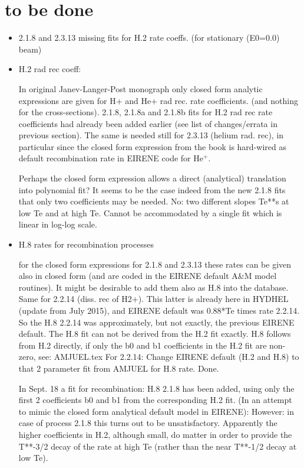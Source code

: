 \documentclass[12pt,dvipdfmx]{article}
\begin{document}
\section{to be done}

\begin{itemize}
\item {2.1.8  and 2.3.13 missing fits for H.2 rate coeffs. (for stationary (E0=0.0) beam)}

\item {H.2 rad rec coeff:}

In original Janev-Langer-Post monograph only closed form analytic expressions are given for H+ and He+ rad rec. rate coefficients.
(and nothing for the cross-sections).
2.1.8, 2.1.8a and 2.1.8b fits for H.2 rad rec rate coefficients had already been added earlier (see list of changes/errata in previous section).
The same is needed still for
2.3.13 (helium rad. rec), in particular since the closed form
expression from the book is hard-wired as default recombination rate in EIRENE code for He$^+$.

Perhaps the closed form expression allows a direct (analytical)
translation into polynomial fit?
It seems to be the case indeed from
the new 2.1.8 fits that only two coefficients may be needed.
No: two different slopes Te**s at low Te and at high Te. Cannot be accommodated
by a single fit which is linear in log-log scale.

\item {H.8 rates for recombination processes}

for the closed form expressions for 2.1.8 and 2.3.13 these rates can be given also in closed form (and are coded in
the EIRENE default A\&M model routines). It might be desirable to add them also as H.8
into the database. Same for 2.2.14 (diss. rec of H2+).
This latter is already here in HYDHEL (update from July 2015),
and EIRENE default was 0.88*Te times rate 2.2.14.
So the H.8  2.2.14 was approximately, but not exactly, the previous EIRENE default.
The H.8 fit can not be derived from the H.2 fit exactly.
H.8 follows from H.2 directly, if only the b0 and b1 coefficients in the H.2 fit are non-zero, see: AMJUEL.tex
For 2.2.14: Change EIRENE default (H.2 and H.8) to that 2 parameter fit
from AMJUEL for H.8 rate. Done.

In Sept. 18  a fit for recombination: H.8 2.1.8 has been added, using only the first 2 coefficients b0 and b1 from
the corresponding H.2 fit. (In an attempt to mimic the closed form analytical default model in EIRENE):
However: in case of process 2.1.8 this turns out to be unsatisfactory.
Apparently the higher coefficients in H.2, although small, do matter in order to provide the
T**-3/2 decay of the rate at high Te (rather than the near T**-1/2 decay at low Te).



\end{itemize}
\end{document}
